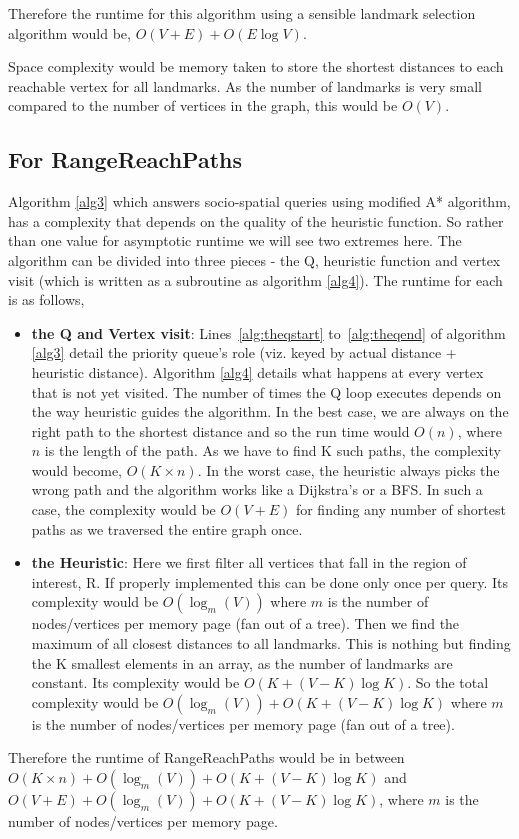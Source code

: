 Therefore the runtime for this algorithm using a sensible landmark selection algorithm would be, $O(V + E) + O(E\log V)$.

Space complexity would be memory taken to store the shortest distances to each reachable vertex for all landmarks. As the number of landmarks is very small compared to the number of vertices in the graph, this would be $O(V)$.

\subsection{For RangeReachPaths}
Algorithm \ref{alg3} which answers socio-spatial queries using modified A* algorithm, has a complexity that depends on the quality of the heuristic function. So rather than one value for asymptotic runtime we will see two extremes here. The algorithm can be divided into three pieces - the Q, heuristic function and vertex visit (which is written as a subroutine as algorithm \ref{alg4}). The runtime for each is as follows,

\begin{itemize}
	\item \textbf{the Q and Vertex visit}: Lines~\ref{alg:theqstart} to~\ref{alg:theqend} of algorithm \ref{alg3} detail the priority queue's role (viz. keyed by actual distance + heuristic distance). Algorithm \ref{alg4} details what happens at every vertex that is not yet visited. The number of times the Q loop executes depends on the way heuristic guides the algorithm. In the best case, we are always on the right path to the shortest distance and so the run time would $O(n)$, where $n$ is the length of the path. As we have to find K such paths, the complexity would become, $O(K \times n)$. In the worst case, the heuristic always picks the wrong path and the algorithm works like a Dijkstra's or a BFS. In such a case, the complexity would be $O(V + E)$ for finding any number of shortest paths as we traversed the entire graph once. 

	\item \textbf{the Heuristic}: Here we first filter all vertices that fall in the region of interest, R. If properly implemented this can be done only once per query. Its complexity would be $O(\log_m (V))$ where $m$ is the number of nodes/vertices per memory page (fan out of a tree). Then we find the maximum of all closest distances to all landmarks. This is nothing but finding the K smallest elements in an array, as the number of landmarks are constant. Its complexity would be $O(K + (V-K)\log K)$. So the total complexity would be $O(\log_m (V)) + O(K + (V-K)\log K)$ where $m$ is the number of nodes/vertices per memory page (fan out of a tree).
\end{itemize}

Therefore the runtime of RangeReachPaths would be in between $O(K \times n) + O(\log_m (V)) + O(K + (V-K)\log K)$ and $O(V + E) + O(\log_m (V)) + O(K + (V-K)\log K)$, where $m$ is the number of nodes/vertices per memory page.